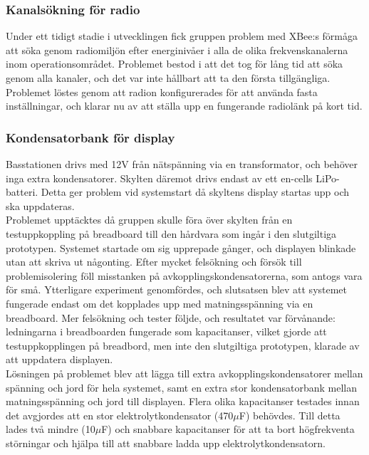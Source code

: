 \documentclass[a4paper,11pt]{article}
\begin{document}
\subsubsection{Kanalsökning för radio}
Under ett tidigt stadie i utvecklingen fick gruppen problem med XBee:s förmåga att söka genom radiomiljön efter energinivåer i alla de olika frekvenskanalerna inom operationsområdet. Problemet bestod i att det tog för lång tid att söka genom alla kanaler, och det var inte hållbart att ta den första tillgängliga. Problemet löstes genom att radion konfigurerades för att använda fasta inställningar, och klarar nu av att ställa upp en fungerande radiolänk på kort tid. 

\subsubsection{Kondensatorbank för display}
Basstationen drivs med 12V från nätspänning via en transformator, och behöver inga extra kondensatorer. Skylten däremot drivs endast av ett en-cells LiPo-batteri. Detta ger problem vid systemstart då skyltens display startas upp och ska uppdateras. \\

Problemet upptäcktes då gruppen skulle föra över skylten från en testuppkoppling på breadboard till den hårdvara som ingår i den slutgiltiga prototypen. Systemet startade om sig upprepade gånger, och displayen blinkade utan att skriva ut någonting. Efter mycket felsökning och försök till problemisolering föll misstanken på avkopplingskondensatorerna, som antogs vara för små. Ytterligare experiment genomfördes, och slutsatsen blev att systemet fungerade endast om det kopplades upp med matningsspänning via en breadboard. Mer felsökning och tester följde, och resultatet var förvånande: ledningarna i breadboarden fungerade som kapacitanser, vilket gjorde att testuppkopplingen på breadbord, men inte den slutgiltiga prototypen, klarade av att uppdatera displayen. \\

Lösningen på problemet blev att lägga till extra avkopplingskondensatorer mellan spänning och jord för hela systemet, samt en extra stor kondensatorbank mellan matningsspänning och jord till displayen. Flera olika kapacitanser testades innan det avgjordes att en stor elektrolytkondensator (470$\mu$F) behövdes. Till detta lades två mindre (10$\mu$F) och snabbare kapacitanser för att ta bort högfrekventa störningar och hjälpa till att snabbare ladda upp elektrolytkondensatorn. \\
\end{document}
